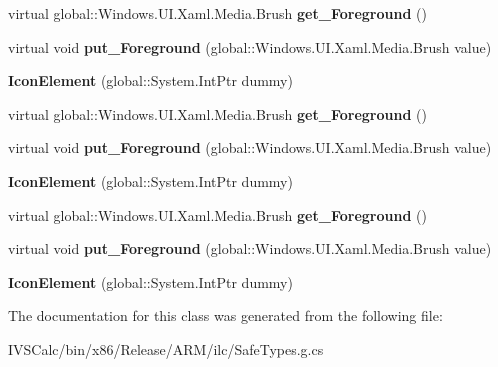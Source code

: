 \begin{DoxyCompactItemize}
virtual global\+::\+Windows.\+U\+I.\+Xaml.\+Media.\+Brush {\bfseries get\+\_\+\+Foreground} ()
\item 
\mbox{\label{class_windows_1_1_u_i_1_1_xaml_1_1_controls_1_1_icon_element_aa8b56f893f1ba3644646a54ddb2950e3}} 
virtual void {\bfseries put\+\_\+\+Foreground} (global\+::\+Windows.\+U\+I.\+Xaml.\+Media.\+Brush value)
\item 
\mbox{\label{class_windows_1_1_u_i_1_1_xaml_1_1_controls_1_1_icon_element_a2b5648363248a4b6c8fbaac0951df7ad}} 
{\bfseries Icon\+Element} (global\+::\+System.\+Int\+Ptr dummy)
\item 
\mbox{\label{class_windows_1_1_u_i_1_1_xaml_1_1_controls_1_1_icon_element_a79a4b40ddfa24c650ae2b595b323cbef}} 
virtual global\+::\+Windows.\+U\+I.\+Xaml.\+Media.\+Brush {\bfseries get\+\_\+\+Foreground} ()
\item 
\mbox{\label{class_windows_1_1_u_i_1_1_xaml_1_1_controls_1_1_icon_element_aa8b56f893f1ba3644646a54ddb2950e3}} 
virtual void {\bfseries put\+\_\+\+Foreground} (global\+::\+Windows.\+U\+I.\+Xaml.\+Media.\+Brush value)
\item 
\mbox{\label{class_windows_1_1_u_i_1_1_xaml_1_1_controls_1_1_icon_element_a2b5648363248a4b6c8fbaac0951df7ad}} 
{\bfseries Icon\+Element} (global\+::\+System.\+Int\+Ptr dummy)
\item 
\mbox{\label{class_windows_1_1_u_i_1_1_xaml_1_1_controls_1_1_icon_element_a79a4b40ddfa24c650ae2b595b323cbef}} 
virtual global\+::\+Windows.\+U\+I.\+Xaml.\+Media.\+Brush {\bfseries get\+\_\+\+Foreground} ()
\item 
\mbox{\label{class_windows_1_1_u_i_1_1_xaml_1_1_controls_1_1_icon_element_aa8b56f893f1ba3644646a54ddb2950e3}} 
virtual void {\bfseries put\+\_\+\+Foreground} (global\+::\+Windows.\+U\+I.\+Xaml.\+Media.\+Brush value)
\item 
\mbox{\label{class_windows_1_1_u_i_1_1_xaml_1_1_controls_1_1_icon_element_a2b5648363248a4b6c8fbaac0951df7ad}} 
{\bfseries Icon\+Element} (global\+::\+System.\+Int\+Ptr dummy)
\end{DoxyCompactItemize}


The documentation for this class was generated from the following file\+:\begin{DoxyCompactItemize}
\item 
I\+V\+S\+Calc/bin/x86/\+Release/\+A\+R\+M/ilc/Safe\+Types.\+g.\+cs\end{DoxyCompactItemize}
